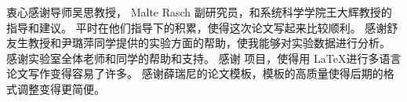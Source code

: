 
\begin{ack}
衷心感谢导师吴思教授， Malte Rasch 副研究员，和系统科学学院王大辉教授的指导和建议。
平时在他们指导下的积累，使得这次论文写起来比较顺利。
感谢舒友生教授和尹璐萍同学提供的实验方面的帮助，使我能够对实验数据进行分析。
感谢实验室全体老师和同学的帮助和支持。
感谢 \XeLaTeX 项目，使得用 \LaTeX 进行多语言论文写作变得容易了许多。
感谢薛瑞尼的论文模板，模板的高质量使得后期的格式调整变得更简便。
\end{ack}
